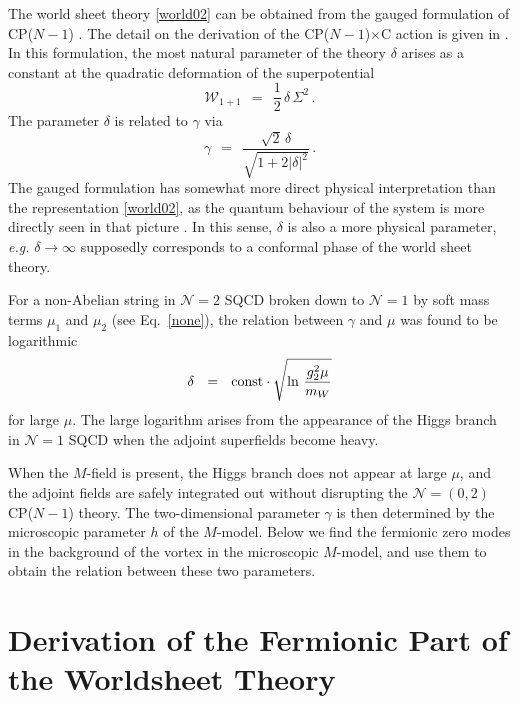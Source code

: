 \documentclass[12pt]{article}
\def\beq{\begin{equation}}
\def\eeq{\end{equation}}
\newcommand{\ntwo}{${\mathcal N}=2$ }
\newcommand{\ntwoo}{${\mathcal N}= \left(0,2\right) $ }
\newcommand{\none}{${\mathcal N}=1$ }
\newcommand{\CPC}{CP($N-1$)$\times$C }
\begin{document}
	The world sheet theory \eqref{world02} can be obtained from the gauged formulation of CP($N-1$) \cite{W93}.
	The detail on the derivation of the \CPC action is given in \cite{BSYhet}.
	In this formulation, the most natural parameter of the theory $\delta$ arises as 
	a constant at the quadratic deformation of the superpotential
\[
	\mathcal{W}_{1+1} ~~=~~ \frac{1}{2}\,\delta\,\Sigma^2\,.
\]
	The parameter $ \delta $ is related to $ \gamma $ via
\[
	\gamma ~~=~~ \frac { \sqrt{2}\,\delta } { \sqrt{ 1 +  2 |\delta|^2 } }\,.
\]
	The gauged formulation has somewhat more direct physical interpretation than
	the representation \eqref{world02}, as the quantum behaviour of the system is more directly
	seen in that picture \cite{SYhetlN}. 
	In this sense, $ \delta $ is also a more physical parameter, {\it e.g.}
	$ \delta \to \infty $ supposedly corresponds to a conformal phase of the world sheet theory.

	For a non-Abelian string in \ntwo SQCD broken down to \none by soft mass terms $ \mu_1 $ and $ \mu_2 $
	(see Eq.~\eqref{none}), the relation between $ \gamma $ and $ \mu $ was found to be logarithmic \cite{BSYhet}
\beq
	\delta ~~=~~ 
	{\rm const} \cdot \sqrt{\ln\, \frac{g_2^2\mu}{m_W}}
\eeq
	for large $ \mu $.
	The large logarithm arises from the appearance of the Higgs branch in \none SQCD when the adjoint superfields
	become heavy.

	When the $ M $-field is present, the Higgs branch does not appear at large $ \mu $, and the adjoint
	fields are safely integrated out without disrupting the \ntwoo CP($N-1$) theory.
	The two-dimensional parameter $ \gamma $ is then determined by the microscopic parameter $ h $ of the 
	$ M $-model. 
	Below we find the fermionic zero modes in the background of the vortex in the microscopic $M$-model,
	and use them to obtain the relation between these two parameters. 
	
%
%
\section{Derivation of the Fermionic Part of the Worldsheet Theory}
\end{document}

